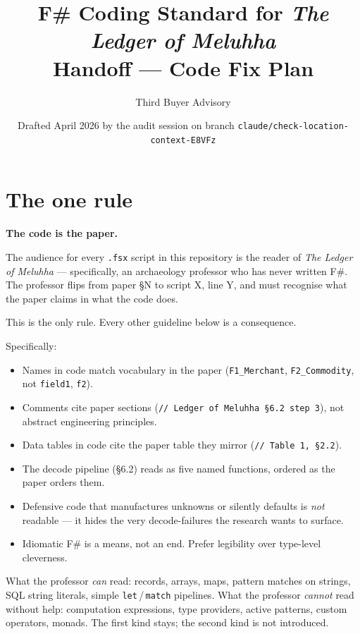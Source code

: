 \documentclass[11pt]{article}
\title{\textbf{F\# Coding Standard for \textit{The Ledger of Meluhha}}\\
  \large Handoff --- Code Fix Plan}
\author{Third Buyer Advisory}
\date{Drafted April 2026 by the audit session on branch \texttt{claude/check-location-context-E8VFz}}
\begin{document}
\maketitle

\section{The one rule}

\textbf{The code is the paper.}

The audience for every \texttt{.fsx} script in this repository is the
reader of \textit{The Ledger of Meluhha} --- specifically, an
archaeology professor who has never written F\#.
The professor flips from paper \S N to script X, line Y, and must
recognise what the paper claims in what the code does.

This is the only rule.
Every other guideline below is a consequence.

Specifically:

\begin{itemize}[leftmargin=2em]
\item Names in code match vocabulary in the paper
  (\texttt{F1\_Merchant}, \texttt{F2\_Commodity}, not
  \texttt{field1}, \texttt{f2}).
\item Comments cite paper sections
  (\texttt{// Ledger of Meluhha §6.2 step 3}), not abstract
  engineering principles.
\item Data tables in code cite the paper table they mirror
  (\texttt{// Table 1, §2.2}).
\item The decode pipeline (\S6.2) reads as five named functions,
  ordered as the paper orders them.
\item Defensive code that manufactures unknowns or silently
  defaults is \emph{not} readable --- it hides the very
  decode-failures the research wants to surface.
\item Idiomatic F\# is a means, not an end.  Prefer legibility
  over type-level cleverness.
\end{itemize}

What the professor \emph{can} read: records, arrays, maps, pattern
matches on strings, SQL string literals, simple
\texttt{let}\,/\,\texttt{match} pipelines.
What the professor \emph{cannot} read without help: computation
expressions, type providers, active patterns, custom operators,
monads.
The first kind stays; the second kind is not introduced.

\end{document}

